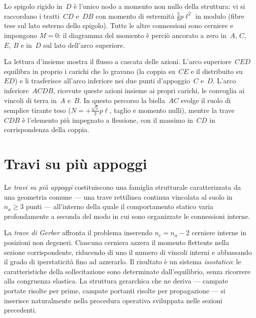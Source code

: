 \begin{oss}
	Lo spigolo rigido in~$D$ è l'unico nodo a momento non
	nullo della struttura: vi si raccordano i tratti~$CD$
	e~$DB$ con momento di estremità $\tfrac56 p\ell^2$ in
	modulo (fibre tese sul lato esterno dello spigolo).
	Tutte le altre connessioni sono cerniere e impongono
	$M = 0$: il diagramma del momento è perciò ancorato a
	zero in~$A$, $C$, $E$, $B$ e in~$D$ sul lato dell'arco
	superiore.
\end{oss}


\begin{oss}
	La lettura d'insieme mostra il flusso a cascata delle
	azioni. L'arco superiore~$CED$ equilibra in proprio i
	carichi che lo gravano (la coppia su~$CE$ e il
	distribuito su~$ED$) e li trasferisce all'arco inferiore
	nei due punti d'appoggio~$C$ e~$D$. L'arco
	inferiore~$ACDB$, ricevute queste azioni insieme ai
	propri carichi, le convoglia ai vincoli di terra in~$A$
	e~$B$. In questo percorso la biella~$AC$ svolge il ruolo
	di semplice tirante teso ($N = +\tfrac{\sqrt5}{3}p\ell$,
	taglio e momento nulli), mentre la trave~$CDB$ è
	l'elemento più impegnato a flessione, con il massimo
	in~$CD$ in corrispondenza della coppia.
\end{oss}




\section{Travi su più appoggi}
\label{sec:travi_piu_appoggi}

Le \emph{travi su più appoggi} costituiscono una famiglia strutturale
caratterizzata da una geometria comune --- una trave rettilinea
continua vincolata al suolo in $n_a \geq 3$ punti --- all'interno
della quale il comportamento statico varia profondamente a seconda
del modo in cui sono organizzate le connessioni interne.

La \emph{trave di Gerber} affronta il problema inserendo
$n_c = n_a - 2$ cerniere interne in posizioni non degeneri.
Ciascuna cerniera azzera il momento flettente nella sezione
corrispondente, riducendo di uno il numero di vincoli interni
e abbassando il grado di iperstaticità fino ad azzerarlo.
Il risultato è un sistema \emph{isostatico}: le caratteristiche
della sollecitazione sono determinate dall'equilibrio, senza
ricorrere alla congruenza elastica. La struttura gerarchica
che ne deriva --- campate portate risolte per prime, campate
portanti risolte per propagazione --- si inserisce naturalmente
nella procedura operativa sviluppata nelle sezioni precedenti.

